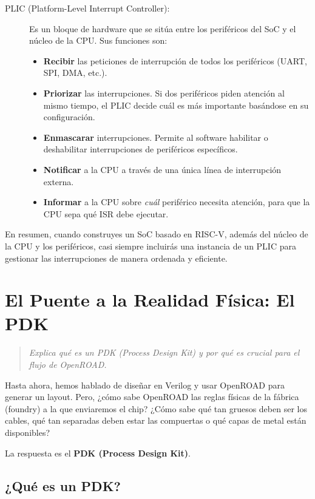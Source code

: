 \documentclass[12pt,a4paper]{article}
\newenvironment{pregunta}
  {\begin{leftbar}\begin{quote}\itshape}
  {\end{quote}\end{leftbar}}
\begin{document}
\begin{description}
    \item[PLIC (Platform-Level Interrupt Controller):] Es un bloque de hardware que se sitúa entre los periféricos del SoC y el núcleo de la CPU. Sus funciones son:
    \begin{itemize}
        \item \textbf{Recibir} las peticiones de interrupción de todos los periféricos (UART, SPI, DMA, etc.).
        \item \textbf{Priorizar} las interrupciones. Si dos periféricos piden atención al mismo tiempo, el PLIC decide cuál es más importante basándose en su configuración.
        \item \textbf{Enmascarar} interrupciones. Permite al software habilitar o deshabilitar interrupciones de periféricos específicos.
        \item \textbf{Notificar} a la CPU a través de una única línea de interrupción externa.
        \item \textbf{Informar} a la CPU sobre \textit{cuál} periférico necesita atención, para que la CPU sepa qué ISR debe ejecutar.
    \end{itemize}
\end{description}

En resumen, cuando construyes un SoC basado en RISC-V, además del núcleo de la CPU y los periféricos, casi siempre incluirás una instancia de un PLIC para gestionar las interrupciones de manera ordenada y eficiente.

\newpage
\section{El Puente a la Realidad Física: El PDK}

\begin{pregunta}
Explica qué es un PDK (Process Design Kit) y por qué es crucial para el flujo de OpenROAD.
\end{pregunta}

Hasta ahora, hemos hablado de diseñar en Verilog y usar OpenROAD para generar un layout. Pero, ¿cómo sabe OpenROAD las reglas físicas de la fábrica (foundry) a la que enviaremos el chip? ¿Cómo sabe qué tan gruesos deben ser los cables, qué tan separadas deben estar las compuertas o qué capas de metal están disponibles?

La respuesta es el \textbf{PDK (Process Design Kit)}.

\subsection{¿Qué es un PDK?}
\end{document}
